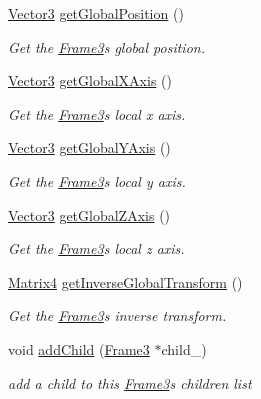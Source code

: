 \begin{DoxyCompactItemize}
\hyperlink{class_magnum_1_1_vector3}{Vector3} \hyperlink{class_magnum_1_1_frame3_a02ef2b5e486c10f94fdf13885c37ebc6}{get\+Global\+Position} ()
\begin{DoxyCompactList}\small\item\em Get the \hyperlink{class_magnum_1_1_frame3}{Frame3}\textquotesingle{}s global position. \end{DoxyCompactList}\item 
\hyperlink{class_magnum_1_1_vector3}{Vector3} \hyperlink{class_magnum_1_1_frame3_aa8919e85a3ebe1869aa8b1ba439bc92f}{get\+Global\+X\+Axis} ()
\begin{DoxyCompactList}\small\item\em Get the \hyperlink{class_magnum_1_1_frame3}{Frame3}\textquotesingle{}s local x axis. \end{DoxyCompactList}\item 
\hyperlink{class_magnum_1_1_vector3}{Vector3} \hyperlink{class_magnum_1_1_frame3_a0692e3724e53edf06e828470e74833cd}{get\+Global\+Y\+Axis} ()
\begin{DoxyCompactList}\small\item\em Get the \hyperlink{class_magnum_1_1_frame3}{Frame3}\textquotesingle{}s local y axis. \end{DoxyCompactList}\item 
\hyperlink{class_magnum_1_1_vector3}{Vector3} \hyperlink{class_magnum_1_1_frame3_a34cb4c58d842bc9dc2622bdb7690446f}{get\+Global\+Z\+Axis} ()
\begin{DoxyCompactList}\small\item\em Get the \hyperlink{class_magnum_1_1_frame3}{Frame3}\textquotesingle{}s local z axis. \end{DoxyCompactList}\item 
\hyperlink{class_magnum_1_1_matrix4}{Matrix4} \hyperlink{class_magnum_1_1_frame3_a2d7bf4c7bedfcdecfe8e4bc4210dd55a}{get\+Inverse\+Global\+Transform} ()
\begin{DoxyCompactList}\small\item\em Get the \hyperlink{class_magnum_1_1_frame3}{Frame3}\textquotesingle{}s inverse transform. \end{DoxyCompactList}\item 
void \hyperlink{class_magnum_1_1_frame3_ae27f7e1f937aa8e7c753a5fbb29edb6a}{add\+Child} (\hyperlink{class_magnum_1_1_frame3}{Frame3} $\ast$child\+\_\+)
\begin{DoxyCompactList}\small\item\em add a child to this \hyperlink{class_magnum_1_1_frame3}{Frame3}\textquotesingle{}s children list \end{DoxyCompactList}\item 

\end{DoxyCompactItemize}
